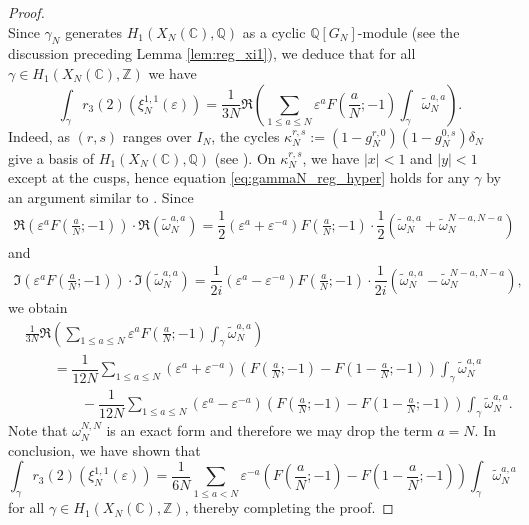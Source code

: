 \documentclass[11pt,a4,leqno]{amsart}
\theoremstyle{my theoremstyle}
\theoremstyle{dfn}
\theoremstyle{remark}
\renewcommand{\1}{\mathbbm{1}}
\newcommand{\Z}{\mathbb{Z}}
\newcommand{\Q}{\mathbb{Q}}
\newcommand{\C}{\mathbb{C}}
\newcommand{\e}{\varepsilon}
\numberwithin{equation}{section}
\begin{document}
\begin{proof}
\begin{equation}
\end{equation}
Since $\gamma_N$ generates $H_1(X_N(\C),\Q)$ as a cyclic $\Q[G_N]$-module (see the discussion preceding Lemma \ref{lem:reg_xi1}), we deduce that for all $\gamma\in H_1(X_N(\C),\Z)$ we have 
$$\int_{\gamma} r_3(2)(\xi_N^{1,1}(\e))=\frac1{3N} \Re \left( \sum_{1 \leq a \leq N} \e^a F\left(\frac{a}N; -1\right)\int_{\gamma} \widetilde{\omega}_N^{a, a} \right). $$
Indeed, as $(r,s)$ ranges over $I_N$, the cycles $\kappa^{r, s}_N:=(1-g_N^{r, 0}) (1-g_N^{0, s}) \delta_N$ give a basis of $H_1(X_N(\C), \Q)$ (see \cite[Theorem 4.1]{Ots}). 
On $\kappa_N^{r, s}$, we have $|x|<1$ and $|y|<1$ except at the cusps, hence equation \eqref{eq:gammaN_reg_hyper} holds for any $\gamma$ by an argument similar to \cite{Ots11}. 
Since 
\begin{align*}
\Re \left(\e^a F\left(\frac{a}N;-1 \right)\right) \cdot \Re\left(\widetilde{\omega}_N^{a, a} \right)
= \dfrac12(\e^a+\e^{-a}) F\left( \frac{a}N;-1 \right) \cdot \dfrac12 (\widetilde{\omega}_N^{a, a}+\widetilde{\omega}_N^{N-a, N-a})
\end{align*}
and 
\begin{align*}
\Im \left(\e^a F\left(\frac{a}N;-1 \right)\right) \cdot \Im\left(\widetilde{\omega}_N^{a, a} \right)
= \dfrac1{2i}(\e^a-\e^{-a}) F\left( \frac{a}N;-1 \right) \cdot \dfrac1{2i} (\widetilde{\omega}_N^{a, a}-\widetilde{\omega}_N^{N-a, N-a}), 
\end{align*}
we obtain
\begin{align*}
&\frac1{3N} \Re \left( \sum_{1 \leq a \leq N} \e^a F\left(\frac{a}N; -1\right)\int_{\gamma} \widetilde{\omega}_N^{a, a} \right) \\
& \qquad = 
\dfrac1{12N}
\sum_{1 \leq a \leq N} 
(\e^a + \e^{-a}) \left(F\left(\frac{a}N; -1\right)-F\left(1-\frac{a}N; -1\right) \right) \int_{\gamma} \widetilde{\omega}_N^{a,a} \\
&\qquad\qquad-
\dfrac1{12N}
\sum_{1 \leq a \leq N} 
(\e^a - \e^{-a}) \left(F\left(\frac{a}N; -1\right)-F\left(1-\frac{a}N; -1\right) \right)
\int_{\gamma} \widetilde{\omega}_N^{a,a}. 
\end{align*}
Note that $\omega_N^{N, N}$ is an exact form and therefore we may drop the term $a=N$.
In conclusion, we have shown that 
\[
\int_{\gamma} r_3(2)(\xi_N^{1,1}(\e))=\dfrac1{6N} \sum_{1 \leq a <N} \e^{-a} \left(F\left(\dfrac{a}{N};-1 \right) - F\left(1-\dfrac{a}{N};-1 \right)\right) \int_{\gamma}\widetilde{\omega}_N^{a, a}
\]
for all $\gamma\in H_1(X_N(\C),\Z)$,
thereby completing the proof. 
\end{proof}
\end{document}
